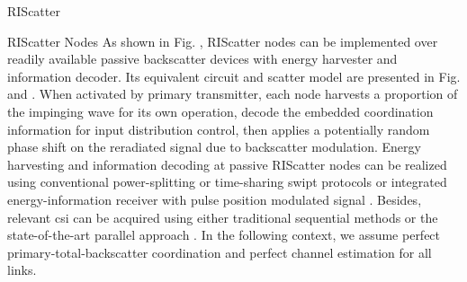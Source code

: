 \documentclass[journal]{IEEEtran}
\begin{document}
\begin{section}{RIScatter}
\begin{subsection}{RIScatter Nodes}
		As shown in Fig. , RIScatter nodes can be implemented over readily available passive backscatter devices with energy harvester and information decoder.
		Its equivalent circuit and scatter model are presented in Fig.  and .
		When activated by primary transmitter, each node harvests a proportion of the impinging wave for its own operation, decode the embedded coordination information for input distribution control, then applies a potentially random phase shift on the reradiated signal due to backscatter modulation.
		Energy harvesting and information decoding at passive RIScatter nodes can be realized using conventional power-splitting or time-sharing \gls{swipt} protocols \cite{Clerckx2019} or integrated energy-information receiver with pulse position modulated signal \cite{Kim2021a}.
		Besides, relevant \gls{csi} can be acquired using either traditional sequential methods \cite{Bharadia2015,Yang2015b,Guo2019g} or the state-of-the-art parallel approach \cite{Jin2021a}.
		In the following context, we assume perfect primary-total-backscatter coordination and perfect channel estimation for all links.
		\begin{figure*}[!t]
			\centering
			\caption{
			Block diagram, equivalent circuit, and scatter model of a RIScatter node.
			The solid and dashed vectors represent signal and energy flows.
			The scattering antenna behaves as a constant power source, where the voltage $V_0$ and current $I_0$ are introduced by incident electric field $\vec{E}_{\mathrm{I}}$ and magnetic field $\vec{H}_{\mathrm{I}}$ \cite{Huang2021}.
			}
			\label{fi:riscatter_node}
		\end{figure*}
	\end{subsection}


\end{section}
\end{document}
